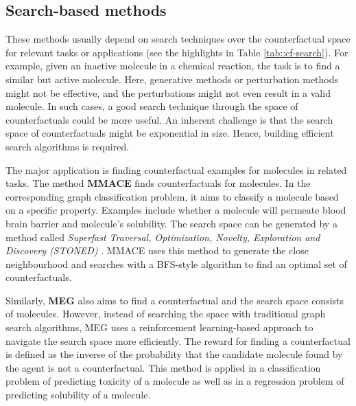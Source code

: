 
\subsection{Search-based methods}
\label{sec::Counterfactual-search}
These methods usually depend on search techniques over the counterfactual space for relevant tasks or applications (see the highlights in Table \ref{tab::cf-search}). For example, given an inactive molecule in a chemical reaction, the task is to find a similar but active molecule. Here, generative methods or perturbation methods might not be effective, and the perturbations might not even result in a valid molecule. In such cases, a good search technique through the space of counterfactuals could be more useful. An inherent challenge is that the search space of counterfactuals might be exponential in size. Hence, building efficient search algorithms is required.



The major application is finding counterfactual examples for molecules in related tasks. The method \textbf{MMACE} \cite{agnostic-counter} finds counterfactuals for molecules.
In the corresponding graph classification problem, it aims to classify a molecule based on a specific property. Examples include whether a molecule will permeate blood brain barrier and molecule's solubility.
The search space can be generated by a method called \textit{Superfast Traversal, Optimization, Novelty, Exploration and Discovery (STONED)} \cite{nigam2021beyond}. MMACE uses this method to generate the close neighbourhood and searches with a BFS-style algorithm to find an optimal set of counterfactuals.



Similarly, \textbf{MEG} \cite{meg-counter} also aims to find a counterfactual and the search space consists of molecules. However, instead of searching the space with traditional graph search algorithms, MEG uses a reinforcement learning-based approach to navigate the search space more efficiently. The reward for finding a counterfactual is defined as the inverse of the probability that the candidate molecule found by the agent is not a counterfactual. This method is applied in a classification problem of predicting toxicity of a molecule as well as in a regression problem of predicting solubility of a molecule.

